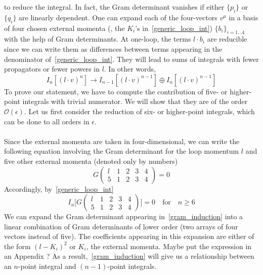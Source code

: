 to reduce the integral.
In fact, the Gram determinant vanishes if either $\{p_i\}$ or $\{q_i\}$ are linearly dependent.
One can expand each of the four-vectors $v^\mu$ in a basis of four chosen external momenta (\ie , the $K_i$'s in~\cref{generic_loop_int}) $\{b_i\}_{i=1\ldots 4}$ with the help of Gram determinants.
At one-loop, the terms $l\cdot b_i$ are reducible since we can write them as differences between terms appearing in the denominator of~\cref{generic_loop_int}.
They will lead to sums of integrals with fewer propagators or fewer powers in $l$. 
In other words, 
\begin{equation*}
I_n[(l\cdot v)^n] \rightarrow I_{n-1}[(l\cdot v)^{n-1}]\oplus I_n[(l\cdot v)^{n-1}]
\end{equation*}
To prove our statement, we have to compute the contribution of five- or higher-point integrals with trivial numerator. 
We will show that they are of the order $\mathcal{O}(\epsilon)$.
Let us first consider the reduction of six- or higher-point integrals, which can be done to all orders in $\epsilon$. 
\\\\
Since the external momenta are taken in four-dimensional,
we can write the following equation involving the Gram determinant for the loop momentum $l$ and five other external momenta (denoted only by numbers) 
\begin{equation*}
G\begin{pmatrix}
l & 1 & 2 & 3 & 4\\
5 & 1 & 2 & 3 & 4 
\end{pmatrix}
 = 0
\end{equation*}
Accordingly, by~\cref{generic_loop_int}
\begin{equation}\label{gram_induction}
I_n\Big[G\begin{pmatrix}
l & 1 & 2 & 3 & 4\\
5 & 1 & 2 & 3 & 4 
\end{pmatrix}\Big]
 = 0
 \quad\mathrm{for}\quad n\geq 6
\end{equation}
We can expand the Gram determinant appearing in~\cref{gram_induction} into a linear combination of Gram determinants of lower order (two arrays of four vectors instead of five).
The coefficients appearing in this expansion are either of the form $(l-K_i)^2$ or $K_i$, the external momenta.
\color{red} Maybe put the expression in an Appendix ?\color{black}
As a result,~\cref{gram_induction} will give us a relationship between an $n$-point integral and $(n-1)$-point integrals.
\\\\
